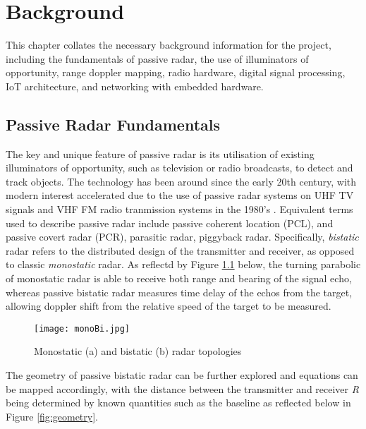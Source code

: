\chapter{Background \label{sec:background}}

\noindent
This chapter collates the necessary background information for the project, including the fundamentals of passive radar, the use of illuminators of opportunity, range doppler mapping, radio hardware, digital signal processing, IoT architecture, and networking with embedded hardware.


\section{Passive Radar Fundamentals}
The key and unique feature of passive radar is its utilisation of existing illuminators of opportunity, such as television or radio broadcasts, to detect and track objects. The technology has been around since the early 20th century, with modern interest accelerated due to the use of passive radar systems on UHF TV signals and VHF FM radio tranmission systems in the 1980's \cite{FundamentalsPassiveRadar}. Equivalent terms used to describe passive radar include passive coherent location (PCL), and passive covert radar (PCR), parasitic radar, piggyback radar. Specifically, \textit{bistatic} radar refers to the distributed design of the transmitter and receiver, as opposed to classic \textit{monostatic} radar. As reflectd by Figure \ref{fig: topology} below, the turning parabolic of monostatic radar is able to receive both range and bearing of the signal echo, whereas passive bistatic radar measures time delay of the echos from the target, allowing doppler shift from the relative speed of the target to be measured.

\begin{figure}[htbp]
    \centering
    \texttt{[image: monoBi.jpg]}
    \caption{Monostatic (a) and bistatic (b) radar topologies \cite{IOTpassiveRadar}}
    \label{fig: topology}
\end{figure}

\par 
\vspace{0.5cm} 
\noindent The geometry of passive bistatic radar can be further explored and equations can be mapped accordingly, with the distance between the transmitter and receiver \textit{R} being determined by known quantities such as the baseline as reflected below in Figure \ref{fig:geometry}.


